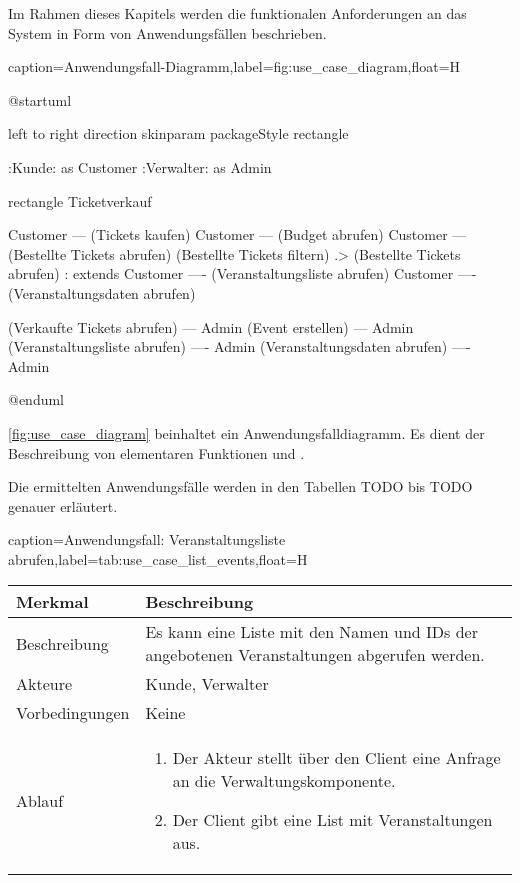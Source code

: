 Im Rahmen dieses Kapitels werden die funktionalen Anforderungen an das System in Form von Anwendungsfällen beschrieben. 

\begin{dhbwfigure}{caption=Anwendungsfall-Diagramm,label=fig:use_case_diagram,float=H}
    \begin{plantuml}
        @startuml

            left to right direction
            skinparam packageStyle rectangle

            :Kunde: as Customer
            :Verwalter: as Admin

            rectangle Ticketverkauf {
                Customer --- (Tickets kaufen)
                Customer --- (Budget abrufen)
                Customer --- (Bestellte Tickets abrufen)
                (Bestellte Tickets filtern) .> (Bestellte Tickets abrufen) : extends
                Customer ---- (Veranstaltungsliste abrufen)
                Customer ---- (Veranstaltungsdaten abrufen)

                (Verkaufte Tickets abrufen) --- Admin
                (Event erstellen) --- Admin
                (Veranstaltungsliste abrufen) ---- Admin
                (Veranstaltungsdaten abrufen) ---- Admin
            }
        @enduml
    \end{plantuml}
\end{dhbwfigure}

\autoref{fig:use_case_diagram} beinhaltet ein Anwendungsfalldiagramm.
Es dient der Beschreibung von elementaren Funktionen und .

Die ermittelten Anwendungsfälle werden in den Tabellen TODO bis TODO genauer erläutert. %

\begin{dhbwtable}{caption={Anwendungsfall: Veranstaltungsliste abrufen},label=tab:use_case_list_events,float=H}
    \begin{tabularx}{\textwidth}{lX}
        \toprule
        \textbf{Merkmal} & \textbf{Beschreibung}  \\ \midrule
        Beschreibung    & Es kann eine Liste mit den Namen und IDs der angebotenen Veranstaltungen abgerufen werden. \\
        Akteure         & Kunde, Verwalter \\
        Vorbedingungen  & Keine \\
        Ablauf          & \begin{enumerate}
            \item Der Akteur stellt über den Client eine Anfrage an die Verwaltungskomponente.
            \item Der Client gibt eine List mit Veranstaltungen aus.
        \end{enumerate} \\\bottomrule
    \end{tabularx}    
\end{dhbwtable}

